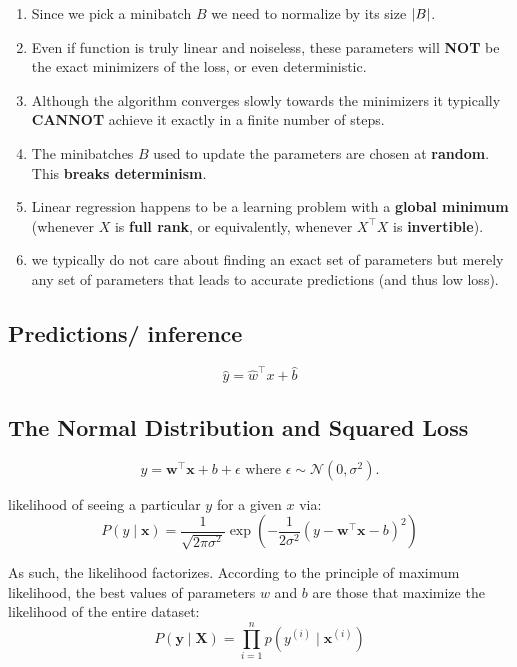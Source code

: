 \vspace{0.5cm}
\begin{enumerate}[itemsep=0.2cm]
    \item Since we pick a minibatch $B$ we need to normalize by its size $\left| B \right|$.

    \item Even if function is truly linear and noiseless, these parameters will \textbf{NOT} be the exact minimizers of the loss, or even deterministic. 
    
    \item Although the algorithm converges slowly towards the minimizers it typically \textbf{CANNOT} achieve it exactly in a finite number of steps. 
    
    \item The minibatches $B$ used to update the parameters are chosen at \textbf{random}. This \textbf{breaks determinism}.

    \item Linear regression happens to be a learning problem with a \textbf{global minimum} (whenever $X$ is \textbf{full rank}, or equivalently, whenever $X^\top X$ is \textbf{invertible}).

    \item we typically do not care about finding an exact set of parameters but merely any set of parameters that leads to accurate predictions (and thus low loss).
\end{enumerate}


\subsection*{Predictions/ inference \cite{dnn-1}}
\[
    \hat{y} = \hat{w}^\top x + \hat{b}
\]


\subsection*{The Normal Distribution and Squared Loss \cite{dnn-1}}

\[
    y = \mathbf{w}^\top \mathbf{x} + b + \epsilon 
    \textrm{ where } 
    \epsilon \sim \mathcal{N}(0, \sigma^2).
\]

likelihood of seeing a particular $y$ for a given $x$ via:
\[
    \displaystyle
    P(y \mid \mathbf{x}) = \frac{1}{\sqrt{2 \pi \sigma^2}} \exp\left(-\frac{1}{2 \sigma^2} (y - \mathbf{w}^\top \mathbf{x} - b)^2\right)
\]

As such, the likelihood factorizes. According to the principle of maximum likelihood, the best values of parameters $w$ and $b$ are those that maximize the likelihood of the entire dataset:
\[
    \displaystyle
    P(\mathbf y \mid \mathbf X) = \prod_{i=1}^{n} p(y^{(i)} \mid \mathbf{x}^{(i)})
\]

